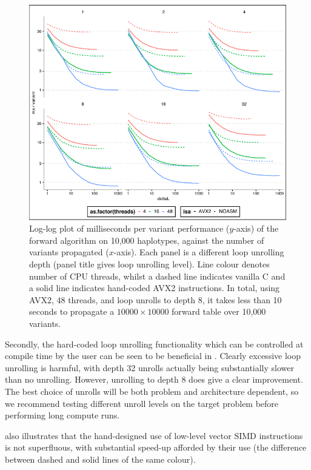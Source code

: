 \documentclass[pdflatex,referee,lineno,sn-nature]{sn-jnl}%
\let\proglang=\textsf
\begin{document}
\begin{figure}
  \centering
  \includegraphics{fig3}
	\caption{
	  Log-log plot of milliseconds per variant performance ($y$-axis) of the forward algorithm on 10,000 haplotypes, against the number of variants propagated ($x$-axis).
	  Each panel is a different loop unrolling depth (panel title gives loop unrolling level).
	  Line colour denotes number of CPU threads, whilst a dashed line indicates vanilla \proglang{C} and a solid line indicates hand-coded AVX2 instructions.
	  In total, using AVX2, 48 threads, and loop unrolls to depth 8, it takes less than 10 seconds to propagate a $10000 \times 10000$ forward table over 10,000 variants.
	}
	\label{fig:perfdeltaL1}
\end{figure}

Secondly, the hard-coded loop unrolling functionality which can be controlled at compile time by the user can be seen to be beneficial in .
Clearly excessive loop unrolling is harmful, with depth 32 unrolls actually being substantially slower than no unrolling.
However, unrolling to depth 8 does give a clear improvement.
The best choice of unrolls will be both problem and architecture dependent, so we recommend testing different unroll levels on the target problem before performing long compute runs.

 also illustrates that the hand-designed use of low-level vector SIMD instructions is not superfluous, with substantial speed-up afforded by their use (the difference between dashed and solid lines of the same colour).
\end{document}
